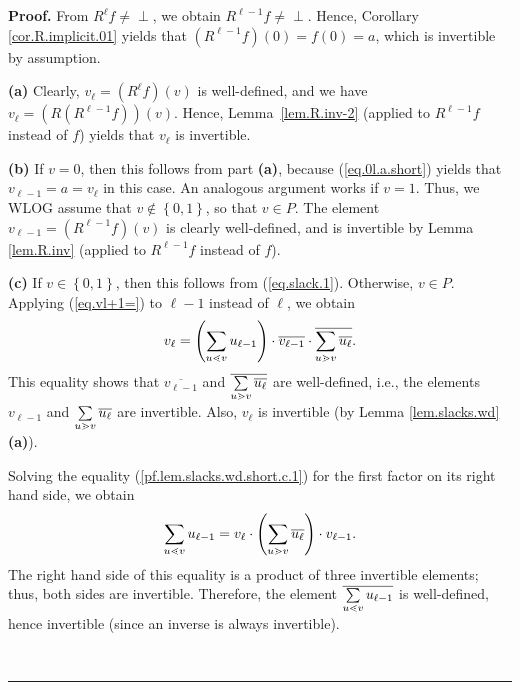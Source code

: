 \documentclass[numbers=enddot,12pt,final,onecolumn,notitlepage]{scrartcl}%
\theoremstyle{definition}
\newenvironment{vershort}{}{}
\newcommand{\undf}{\operatorname*{\bot}}
\newenvironment{proof}[1][Proof]{\noindent\textbf{#1.} }{\ \rule{0.5em}{0.5em}}
\let\sumnonlimits\sum
\renewcommand{\sum}{\sumnonlimits\limits}
\begin{document}
\begin{vershort}


\begin{proof}
From $R^{\ell}f \neq\undf$, we obtain $R^{\ell- 1} f \neq\undf$. Hence,
Corollary \ref{cor.R.implicit.01} yields that $\left(  R^{\ell-1}f\right)
\left(  0\right)  =f\left(  0\right)  =a$, which is invertible by assumption.
\medskip

\textbf{(a)} Clearly, $v_{\ell}=\left(  R^{\ell}f\right)  \left(  v\right)  $
is well-defined, and we have $v_{\ell} = \left(  R\left(  R^{\ell-1}f\right)
\right)  \left(  v\right)  $. Hence, Lemma~\ref{lem.R.inv-2} (applied to
$R^{\ell-1}f$ instead of $f$) yields that $v_{\ell}$ is invertible. \medskip

\textbf{(b)} If $v=0$, then this follows from part \textbf{(a)}, because
(\ref{eq.0l.a.short}) yields that $v_{\ell-1}=a=v_{\ell}$ in this case. An
analogous argument works if $v=1$. Thus, we WLOG assume that $v\notin\left\{
0,1\right\}  $, so that $v\in P$. The element $v_{\ell-1}=\left(  R^{\ell
-1}f\right)  \left(  v\right)  $ is clearly well-defined, and is invertible by
Lemma \ref{lem.R.inv} (applied to $R^{\ell-1}f$ instead of $f$). \medskip

\textbf{(c)} If $v\in\left\{  0,1\right\}  $, then this follows from
(\ref{eq.slack.1}). Otherwise, $v\in P$. Applying (\ref{eq.vl+1=}) to $\ell-1$
instead of $\ell$, we obtain%
\begin{equation}
v_{\ell}=\left(  \sum\limits_{u\lessdot v}u_{\ell-1}\right)  \cdot
\overline{v_{\ell-1}}\cdot\overline{\sum\limits_{u\gtrdot v}\overline{u_{\ell
}}}. \label{pf.lem.slacks.wd.short.c.1}%
\end{equation}
This equality shows that $\overline{v_{\ell-1}}$ and $\overline{\sum
\limits_{u\gtrdot v}\overline{u_{\ell}}}$ are well-defined, i.e., the elements
$v_{\ell-1}$ and $\sum\limits_{u\gtrdot v}\overline{u_{\ell}}$ are invertible.
Also, $v_{\ell}$ is invertible (by Lemma \ref{lem.slacks.wd} \textbf{(a)}).

Solving the equality (\ref{pf.lem.slacks.wd.short.c.1}) for the first factor
on its right hand side, we obtain
\begin{align*}
\sum\limits_{u\lessdot v}u_{\ell-1} = v_{\ell}\cdot\left(  \sum
\limits_{u\gtrdot v}\overline{u_{\ell}}\right)  \cdot v_{\ell-1} .
\end{align*}
The right hand side of this equality is a product of three invertible
elements; thus, both sides are invertible. Therefore, the element
$\overline{\sum\limits_{u\lessdot v}u_{\ell-1}}$ is well-defined, hence
invertible (since an inverse is always invertible).


\end{proof}
\end{vershort}
\end{document}
